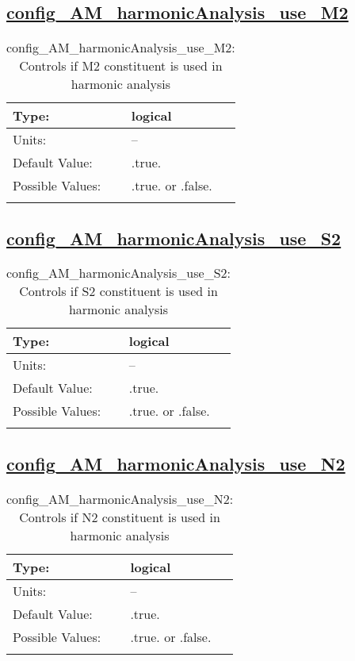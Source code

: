 \subsection[config\_AM\_harmonicAnalysis\_use\_M2]{\hyperref[sec:nm_tab_AM_harmonicAnalysis]{config\_AM\_harmonicAnalysis\_use\_M2}}
\label{subsec:nm_sec_config_AM_harmonicAnalysis_use_M2}
\begin{center}
\begin{longtable}{| p{2.0in} || p{4.0in} |}
    \hline
    Type: & logical \\
    \hline
    Units: & -- \\
    \hline
    Default Value: & .true. \\
    \hline
    Possible Values: & .true. or .false. \\
    \hline
    \caption{config\_AM\_harmonicAnalysis\_use\_M2: Controls if M2 constituent is used in harmonic analysis}
\end{longtable}
\end{center}
\subsection[config\_AM\_harmonicAnalysis\_use\_S2]{\hyperref[sec:nm_tab_AM_harmonicAnalysis]{config\_AM\_harmonicAnalysis\_use\_S2}}
\label{subsec:nm_sec_config_AM_harmonicAnalysis_use_S2}
\begin{center}
\begin{longtable}{| p{2.0in} || p{4.0in} |}
    \hline
    Type: & logical \\
    \hline
    Units: & -- \\
    \hline
    Default Value: & .true. \\
    \hline
    Possible Values: & .true. or .false. \\
    \hline
    \caption{config\_AM\_harmonicAnalysis\_use\_S2: Controls if S2 constituent is used in harmonic analysis}
\end{longtable}
\end{center}
\subsection[config\_AM\_harmonicAnalysis\_use\_N2]{\hyperref[sec:nm_tab_AM_harmonicAnalysis]{config\_AM\_harmonicAnalysis\_use\_N2}}
\label{subsec:nm_sec_config_AM_harmonicAnalysis_use_N2}
\begin{center}
\begin{longtable}{| p{2.0in} || p{4.0in} |}
    \hline
    Type: & logical \\
    \hline
    Units: & -- \\
    \hline
    Default Value: & .true. \\
    \hline
    Possible Values: & .true. or .false. \\
    \hline
    \caption{config\_AM\_harmonicAnalysis\_use\_N2: Controls if N2 constituent is used in harmonic analysis}
\end{longtable}
\end{center}
